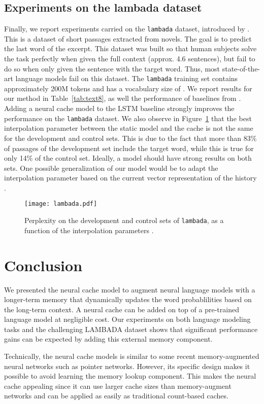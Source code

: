 \documentclass{article} \usepackage{iclr2017_conference,times}
\begin{document}
\subsection{Experiments on the lambada dataset}
Finally, we report experiments carried on the \texttt{lambada} dataset, introduced by \citet{paperno2016lambada}.
This is a dataset of short passages extracted from novels.
The goal is to predict the last word of the excerpt.
This dataset was built so that human subjects solve the task perfectly when given the full context (approx. 4.6 sentences), but fail to do so when only given the sentence with the target word.
Thus, most state-of-the-art language models fail on this dataset.
The \texttt{lambada} training set contains approximately 200M tokens and has a vocabulary size of .
We report results for our method in Table~\ref{tab:text8}, as well the performance of baselines from \citet{paperno2016lambada}.
Adding a neural cache model to the LSTM baseline strongly improves the performance on the \texttt{lambada} dataset.
We also observe in Figure~\ref{fig:lambada} that the best interpolation parameter between the static model and the cache is not the same for the development and control sets.
This is due to the fact that more than 83\% of passages of the development set include the target word, while this is true for only 14\% of the control set.
Ideally, a model should have strong results on both sets.
One possible generalization of our model would be to adapt the interpolation parameter based on the current vector representation of the history .

\begin{figure}
  \centering
  \texttt{[image: lambada.pdf]}

  \vspace{-0.3cm}
  \caption{Perplexity on the development and control sets of \texttt{lambada}, as a function of the interpolation parameters .}
  \label{fig:lambada}
\end{figure}
 
\section{Conclusion}

We presented the neural cache model to augment neural language models
with a longer-term memory that dynamically updates the word
probablilities based on the long-term context. A neural cache can be
added on top of a pre-trained language model at negligible cost. Our
experiments on both language modeling tasks and the challenging
LAMBADA dataset shows that significant performance gains can be
expected by adding this external memory component.

Technically, the neural cache models is similar to some recent
memory-augmented neural networks such as pointer networks. However,
its specific design makes it possible to avoid learning the memory
lookup component. This makes the neural cache appealing since
it can use larger cache sizes than memory-augment networks and can be
applied as easily as traditional count-based caches.
 
\small


\end{document}
